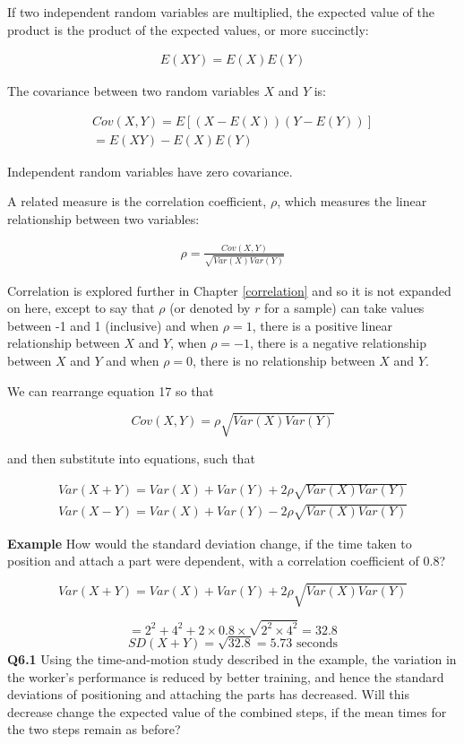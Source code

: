 \documentclass[
  oneside]{krantz}
\begin{document}
If two independent random variables are multiplied, the expected value of the product is the product of the expected values, or more succinctly:

\begin{align}
E(XY) = E(X)E(Y)
\end{align}

The covariance between two random variables \(X\) and \(Y\) is:

\begin{align}
Cov(X,Y) = E[(X-E(X))(Y-E(Y))] \\
= E(XY) - E(X)E(Y)
\end{align}

Independent random variables have zero covariance.

A related measure is the correlation coefficient, \(\rho\), which measures the linear relationship between two variables:

\begin{align}
\rho = \frac{Cov(X,Y)}{\sqrt{Var(X)Var(Y)}}
\end{align}

Correlation is explored further in Chapter \ref{correlation} and so it is not expanded on here, except to say that \(\rho\) (or denoted by \(r\) for a sample) can take values between -1 and 1 (inclusive) and when \(\rho=1\), there is a positive linear relationship between \(X\) and \(Y\), when \(\rho=-1\), there is a negative relationship between \(X\) and \(Y\) and when \(\rho=0\), there is no relationship between \(X\) and \(Y\).

We can rearrange equation 17 so that

\[Cov(X,Y) = \rho \sqrt{Var(X)Var(Y)}\]

and then substitute into equations, such that

\begin{align}
Var(X+Y) = Var(X) + Var(Y) + 2\rho \sqrt{Var(X)Var(Y)} \\
Var(X-Y) = Var(X) + Var(Y) - 2\rho \sqrt{Var(X)Var(Y)}
\end{align}

\textbf{Example} How would the standard deviation change, if the time taken to position and attach a part were dependent, with a correlation coefficient of 0.8?

\[Var(X+Y) = Var(X) + Var(Y) + 2\rho\sqrt{Var(X)Var(Y)}\]

\[ =2^2 + 4^2 + 2 \times 0.8 \times \sqrt{2^2 \times 4^2} = 32.8\]
\[SD(X+Y) = \sqrt{32.8} = 5.73 \textrm{ seconds}\]
\textbf{Q6.1} Using the time-and-motion study described in the example, the variation in the worker's performance is reduced by better training, and hence the standard deviations of positioning and attaching the parts has decreased. Will this decrease change the expected value of the combined steps, if the mean times for the two steps remain as before?
\end{document}

